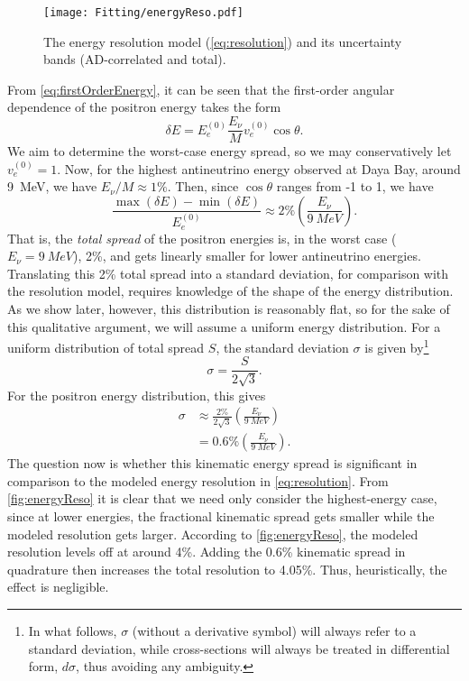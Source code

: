 \documentclass[../thesis.tex]{subfiles}
\begin{document}
\begin{figure}[ht]
  \texttt{[image: Fitting/energyReso.pdf]}
  \caption{The energy resolution model (\autoref{eq:resolution}) and its uncertainty bands (AD-correlated and total).}
  \label{fig:energyReso}
\end{figure}

From \autoref{eq:firstOrderEnergy}, it can be seen that the first-order angular dependence of the positron energy takes the form
\begin{equation}
  \delta E = E_e^{(0)} \frac{E_\nu}{M}v_e^{(0)}\cos\theta.
\end{equation}
We aim to determine the worst-case energy spread, so we may conservatively let $v_e^{(0)} = 1$. Now, for the highest antineutrino energy observed at Daya Bay, around 9~MeV, we have $E_\nu/M \approx 1\%$. Then, since $\cos\theta$ ranges from -1 to 1, we have
\begin{equation}
  \frac{\max(\delta E) - \min(\delta E)}{E_e^{(0)}} \approx 2\% \left( \frac{E_\nu}{\SI{9}{MeV}} \right).
\end{equation}
That is, the \emph{total spread} of the positron energies is, in the worst case ($E_\nu = \SI{9}{MeV}$), 2\%, and gets linearly smaller for lower antineutrino energies. Translating this 2\% total spread into a standard deviation, for comparison with the resolution model, requires knowledge of the shape of the energy distribution. As we show later, however, this distribution is reasonably flat, so for the sake of this qualitative argument, we will assume a uniform energy distribution. For a uniform distribution of total spread $S$, the standard deviation $\sigma$ is given by\footnote{In what follows, $\sigma$ (without a derivative symbol) will always refer to a standard deviation, while cross-sections will always be treated in differential form, $d\sigma$, thus avoiding any ambiguity.}
\begin{equation}
  \sigma = \frac{S}{2\sqrt{3}}.
\end{equation}
For the positron energy distribution, this gives
\begin{equation}
  \begin{aligned}
    \sigma & \approx \frac{2\%}{2\sqrt{3}} \left( \frac{E_\nu}{\SI{9}{MeV}} \right) \\
    & = 0.6\% \left( \frac{E_\nu}{\SI{9}{MeV}} \right).
  \end{aligned}
\end{equation}
The question now is whether this kinematic energy spread is significant in comparison to the modeled energy resolution in \autoref{eq:resolution}. From \autoref{fig:energyReso} it is clear that we need only consider the highest-energy case, since at lower energies, the fractional kinematic spread gets smaller while the modeled resolution gets larger. According to \autoref{fig:energyReso}, the modeled resolution levels off at around 4\%. Adding the 0.6\% kinematic spread in quadrature then increases the total resolution to 4.05\%. Thus, heuristically, the effect is negligible.
\end{document}
